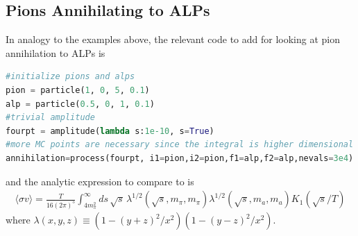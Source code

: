 \documentclass[superscriptaddress,nofootinbib,notitlepage,onecolumn]{revtex4-1}
\newcommand{\beq}{\begin{eqnarray}}
\newcommand{\eeq}{\end{eqnarray}}
\begin{document}
\subsection{Pions Annihilating to ALPs}
In analogy to the examples above, the relevant code to add for looking at pion annihilation to ALPs is 
\begin{lstlisting}[language=Python]
#initialize pions and alps
pion = particle(1, 0, 5, 0.1)
alp = particle(0.5, 0, 1, 0.1)
#trivial amplitude
fourpt = amplitude(lambda s:1e-10, s=True)
#more MC points are necessary since the integral is higher dimensional
annihilation=process(fourpt, i1=pion,i2=pion,f1=alp,f2=alp,nevals=3e4)
\end{lstlisting}
and the analytic expression to compare to is 
\beq 
\langle \sigma v \rangle = \frac{T}{16 (2 \pi)^5} \int_{4 m_\pi^2}^{\infty} ds\, \sqrt{s} \,\lambda^{1/2}(\sqrt{s}, m_\pi, m_\pi)\lambda^{1/2}(\sqrt{s}, m_a, m_a) K_1 (\sqrt{s}/T)
\eeq
where $\lambda(x, y, z) \equiv (1 - (y + z)^2/x^2) (1 - (y- z)^2/x^2)$.

%    
\end{document}
